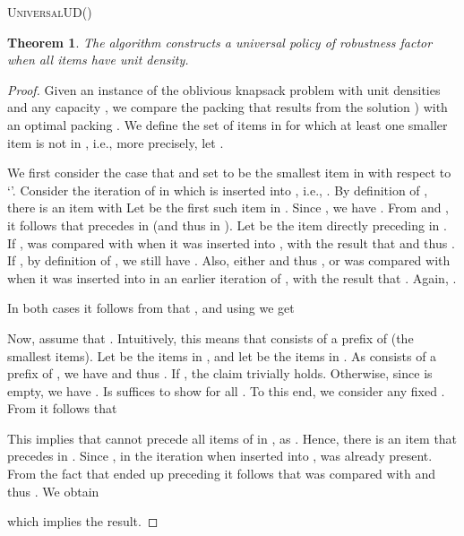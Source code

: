 \documentclass[11pt]{article}
\newtheorem{theorem}{Theorem}
\begin{document}
\begin{algorithm}[tb]      
  \DontPrintSemicolon    
  \caption{\textsc{UniversalUD}()\label{our_algo_ud}}        
  \;   
  \;   
  \For{}      
  {                
    \;            
    { \; }            
\;        
  }   
  \Return \;  
\end{algorithm}
\begin{theorem}
The algorithm  constructs a universal policy
of robustness factor  when all items have unit density. \end{theorem}
\begin{proof}
Given an instance  of the oblivious knapsack problem with unit
densities and any capacity , we compare the packing
 that results from the solution )
with an optimal packing . We define the set  of items
in  for which at least one smaller item is not in ,
i.e., more precisely, let .

We first consider the case that  and set 
to be the smallest item in  with respect to `'. Consider
the iteration  of  in which  is
inserted into , i.e., . By definition of , there
is an item  with  Let  be the first
such item in . Since , we have .
From  and , it follows that  precedes
 in  (and thus in ). Let  be the item directly
preceding  in . If ,  was compared with
 when it was inserted into , with the result that
 and thus . If
, by definition of , we still have .
Also, either  and thus , or  was
compared with  when it was inserted into  in an earlier
iteration of , with the result that .
Again, .

In both cases it follows from  that ,
and using  we get 



Now, assume that . Intuitively, this means that 
consists of a prefix of  (the smallest items). Let 
be the items in , and let 
be the items in . As  consists
of a prefix of , we have  and thus
. If , the claim trivially holds. Otherwise, since
 is empty, we have . Is suffices to show 
for all . To this end, we consider any fixed .
From 
it follows that

 This implies that  cannot precede all items of 
in , as . Hence, there is an item 
that precedes  in . Since , in the iteration
when  inserted  into ,  was
already present. From the fact that  ended up preceding 
it follows that  was compared with  and thus .
We obtain

{which implies the result.}
\end{proof}
\end{document}
